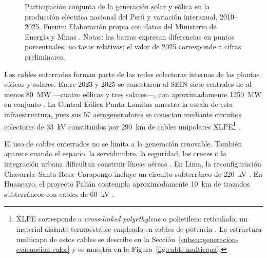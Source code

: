 \begin{figure}[htbp]
\caption[Participación de la generación solar y eólica en el Perú]{Participación conjunta de la generación solar y eólica en la producción eléctrica nacional del Perú y variación interanual, 2010--2025. Fuente: Elaboración propia con datos del Ministerio de Energía y Minas \parencites[sec.~10.4]{minem2025anuario2024}[cuadro~4]{minem2025indicadoresDiciembre}. Notas: las barras expresan diferencias en puntos porcentuales, no tasas relativas; el valor de 2025 corresponde a cifras preliminares.}
\label{fig:participacion-renovable-peru}
\end{figure}

Los cables enterrados forman parte de las redes colectoras internas de las plantas eólicas y solares. Entre 2023 y 2025 se conectaron al SEIN siete centrales de al menos \SI{80}{\mega\watt} ---cuatro eólicas y tres solares---, con aproximadamente \SI{1250}{\mega\watt} en conjunto \parencites{osinergmin2024puntaLomitas}{minem2024nuevasRER}{minem2025nuevasCentrales}. La Central Eólica Punta Lomitas muestra la escala de esta infraestructura, pues sus 57 aerogeneradores se conectan mediante circuitos colectores de \SI{33}{\kilo\volt} constituidos por \SI{290}{\kilo\metre} de cables unipolares XLPE\footnote{XLPE corresponde a \textit{cross-linked polyethylene} o polietileno reticulado, un material aislante termoestable empleado en cables de potencia \parencites[9--10]{thue1999electrical}{iec60502_2_2014}. La estructura multicapa de estos cables se describe en la Sección~\ref{subsec:generacion-evacuacion-calor} y se muestra en la Figura~\ref{fig:cable-multicapa}.} \parencite{coes2021puntaLomitasEO}.

El uso de cables enterrados no se limita a la generación renovable. También aparece cuando el espacio, la servidumbre, la seguridad, los cruces o la integración urbana dificultan construir líneas aéreas \parencite{cigre2023overheadLines}. En Lima, la reconfiguración Chavarría--Santa Rosa--Carapongo incluye un circuito subterráneo de \SI{220}{\kilo\volt} \parencite[13]{coes2022planTransmision2023_2032}. En Huancayo, el proyecto Palián contempla aproximadamente \SI{10}{\kilo\metre} de trazados subterráneos con cables de \SI{60}{\kilo\volt} \parencites[168]{coes2022planTransmision2023_2032}[3,55--56]{proinversion2026palian}.

